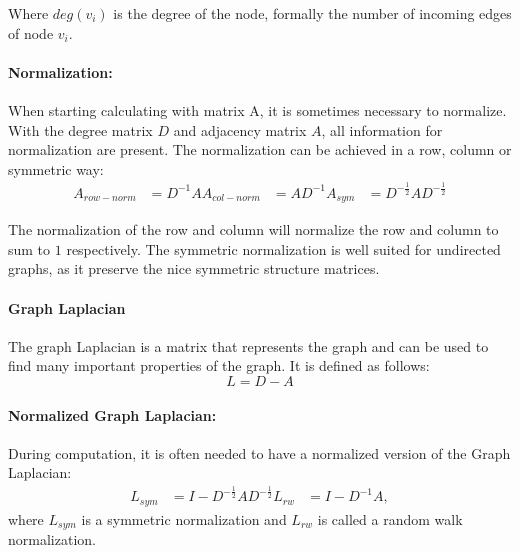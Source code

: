 Where $deg(v_i)$ is the degree of the node, formally the number of incoming edges of node $v_i$.

\paragraph{Normalization:}
When starting calculating with matrix A, it is sometimes necessary to normalize.
With the degree matrix $D$ and adjacency matrix $A$, all information for normalization are present.
The normalization can be achieved in a row, column or symmetric way:
\begin{equation}
    \begin{aligned}
        A_{row-norm} &= D^{-1} A
        A_{col-norm} &= A D^{-1}
        A_{sym}      &=  D^{-\frac{1}{2}} A D^{-\frac{1}{2}}    
    \end{aligned}
\end{equation}

The normalization of the row and column will normalize the row and column to sum to $1$ respectively.
The symmetric normalization is well suited for undirected graphs, as it preserve the nice symmetric structure matrices.


\paragraph{Graph Laplacian}
The graph Laplacian is a matrix that represents the graph and can be used to find many important properties of the graph. 
It is defined as follows:
\begin{equation}
    L = D - A
\end{equation}

\paragraph{Normalized Graph Laplacian:}
During computation, it is often needed to have a normalized version of the Graph Laplacian: \newline
\begin{equation}
    \begin{aligned}
        L_{sym} &= I - D^{-\frac{1}{2}} A D^{-\frac{1}{2}}
        L_{rw}  &= I - D^{-1} A,
    \end{aligned}
\end{equation}
where $L_{sym}$ is a symmetric normalization and $L_{rw}$ is called a random walk normalization.

